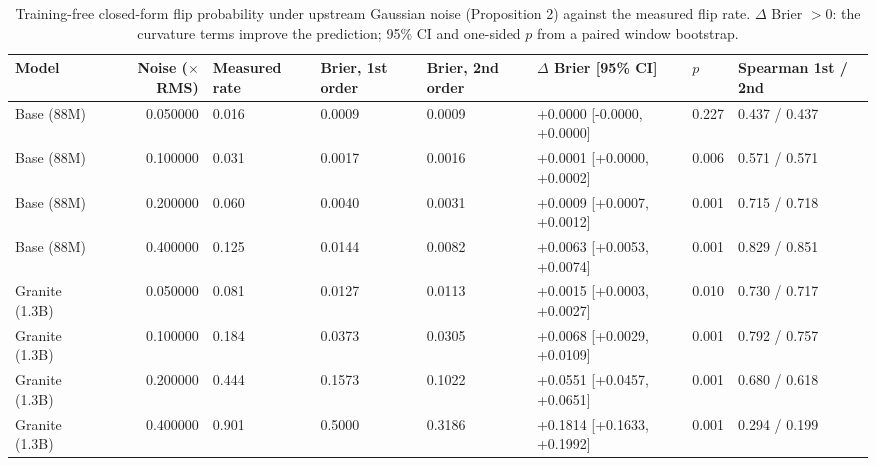 \begin{table}
\caption{Training-free closed-form flip probability under upstream Gaussian noise (Proposition 2) against the measured flip rate. $\Delta$ Brier $>0$: the curvature terms improve the prediction; 95\% CI and one-sided $p$ from a paired window bootstrap.}
\label{tab:analytic}
\begin{tabular}{lrllllll}
\toprule
Model & Noise ($\times$RMS) & Measured rate & Brier, 1st order & Brier, 2nd order & $\Delta$ Brier [95\% CI] & $p$ & Spearman 1st / 2nd \\
\midrule
Base (88M) & 0.050000 & 0.016 & 0.0009 & 0.0009 & +0.0000 [-0.0000, +0.0000] & 0.227 & 0.437 / 0.437 \\
Base (88M) & 0.100000 & 0.031 & 0.0017 & 0.0016 & +0.0001 [+0.0000, +0.0002] & 0.006 & 0.571 / 0.571 \\
Base (88M) & 0.200000 & 0.060 & 0.0040 & 0.0031 & +0.0009 [+0.0007, +0.0012] & 0.001 & 0.715 / 0.718 \\
Base (88M) & 0.400000 & 0.125 & 0.0144 & 0.0082 & +0.0063 [+0.0053, +0.0074] & 0.001 & 0.829 / 0.851 \\
Granite (1.3B) & 0.050000 & 0.081 & 0.0127 & 0.0113 & +0.0015 [+0.0003, +0.0027] & 0.010 & 0.730 / 0.717 \\
Granite (1.3B) & 0.100000 & 0.184 & 0.0373 & 0.0305 & +0.0068 [+0.0029, +0.0109] & 0.001 & 0.792 / 0.757 \\
Granite (1.3B) & 0.200000 & 0.444 & 0.1573 & 0.1022 & +0.0551 [+0.0457, +0.0651] & 0.001 & 0.680 / 0.618 \\
Granite (1.3B) & 0.400000 & 0.901 & 0.5000 & 0.3186 & +0.1814 [+0.1633, +0.1992] & 0.001 & 0.294 / 0.199 \\
\bottomrule
\end{tabular}
\end{table}
